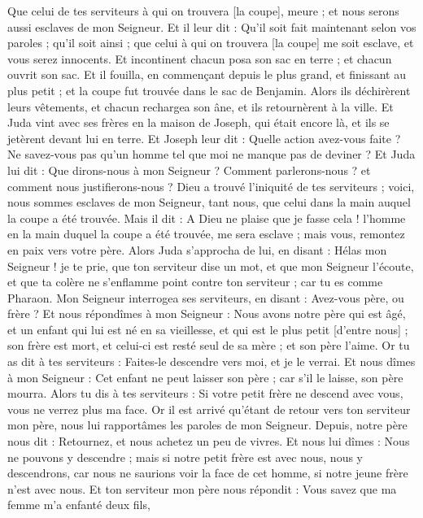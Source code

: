 \begin{multicols}{2}
Que celui de tes serviteurs à qui on trouvera [la coupe], meure ; et nous serons aussi esclaves de mon Seigneur.
Et il leur dit : Qu'il soit fait maintenant selon vos paroles ; qu'il soit ainsi ; que celui à qui on trouvera [la coupe] me soit esclave, et vous serez innocents.
Et incontinent chacun posa son sac en terre ; et chacun ouvrit son sac.
Et il fouilla, en commençant depuis le plus grand, et finissant au plus petit ; et la coupe fut trouvée dans le sac de Benjamin.
Alors ils déchirèrent leurs vêtements, et chacun rechargea son âne, et ils retournèrent à la ville.
Et Juda vint avec ses frères en la maison de Joseph, qui était encore là, et ils se jetèrent devant lui en terre.
Et Joseph leur dit : Quelle action avez-vous faite ? Ne savez-vous pas qu'un homme tel que moi ne manque pas de deviner ?
Et Juda lui dit : Que dirons-nous à mon Seigneur ? Comment parlerons-nous ? et comment nous justifierons-nous ? Dieu a trouvé l'iniquité de tes serviteurs ; voici, nous sommes esclaves de mon Seigneur, tant nous, que celui dans la main auquel la coupe a été trouvée.
Mais il dit : A Dieu ne plaise que je fasse cela ! l'homme en la main duquel la coupe a été trouvée, me sera esclave ; mais vous, remontez en paix vers votre père.
Alors Juda s'approcha de lui, en disant : Hélas mon Seigneur ! je te prie, que ton serviteur dise un mot, et que mon Seigneur l'écoute, et que ta colère ne s'enflamme point contre ton serviteur ; car tu es comme Pharaon.
Mon Seigneur interrogea ses serviteurs, en disant : Avez-vous père, ou frère ?
Et nous répondîmes à mon Seigneur : Nous avons notre père qui est âgé, et un enfant qui lui est né en sa vieillesse, et qui est le plus petit [d'entre nous] ; son frère est mort, et celui-ci est resté seul de sa mère ; et son père l'aime.
Or tu as dit à tes serviteurs : Faites-le descendre vers moi, et je le verrai.
Et nous dîmes à mon Seigneur : Cet enfant ne peut laisser son père ; car s'il le laisse, son père mourra.
Alors tu dis à tes serviteurs : Si votre petit frère ne descend avec vous, vous ne verrez plus ma face.
Or il est arrivé qu'étant de retour vers ton serviteur mon père, nous lui rapportâmes les paroles de mon Seigneur.
Depuis, notre père nous dit : Retournez, et nous achetez un peu de vivres.
Et nous lui dîmes : Nous ne pouvons y descendre ; mais si notre petit frère est avec nous, nous y descendrons, car nous ne saurions voir la face de cet homme, si notre jeune frère n'est avec nous.
Et ton serviteur mon père nous répondit : Vous savez que ma femme m'a enfanté deux fils,

\end{multicols}
